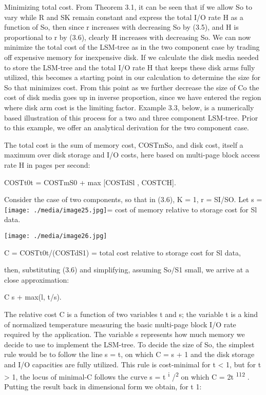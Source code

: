 \documentclass[a4paper,11pt,notitlepage,twoside,openright]{article}
\begin{document}
Minimizing total cost. From Theorem 3.1, it can be seen that if we allow
So to vary while R and SK remain constant and express the total I/O rate
H as a function of So, then since r increases with decreasing So by
(3.5), and H is proportional to r by (3.6), clearly H increases with
decreasing So. We can now minimize the total cost of the LSM-tree as in
the two component case by trading off expensive memory for inexpensive
disk. If we calculate the disk media needed to store the LSM-tree and
the total I/O rate H that keeps these disk arms fully utilized, this
becomes a starting point in our calculation to determine the size for So
that minimizes cost. From this point as we further decrease the size of
Co the cost of disk media goes up in inverse proportion, since we have
entered the region where disk arm cost is the limiting factor. Example
3.3, below, is a numerically based illustration of this process for a
two and three component LSM-tree. Prior to this example, we offer an
analytical derivation for the two component case.

The total cost is the sum of memory cost, COSTmSo, and disk cost, itself
a maximum over disk storage and I/O costs, here based on multi-page
block access rate H in pages per second:

COSTt0t = COSTmS0 + max {[}COSTdSl , COSTCH{]}.

Consider the case of two components, so that in (3.6), K = 1, r = SI/SO.
Let s =
\texttt{[image: ./media/image25.jpg]}=
cost of memory relative to storage cost for Sl data.

\texttt{[image: ./media/image26.jpg]}

C = COSTt0t/(COSTdS1) = total cost relative to storage cost for Sl data,

then, substituting (3.6) and simplifying, assuming So/S1 small, we
arrive at a close approximation:

C s + max(l, t/s).

The relative cost C is a function of two variables t and s; the variable
t is a kind of normalized temperature measuring the basic multi-page
block I/O rate required by the application. The variable s represents
how much memory we decide to use to implement the LSM-tree. To decide
the size of So, the simplest rule would be to follow the line s = t, on
which C = s + 1 and the disk storage and I/O capacities are fully
utilized. This rule is cost-minimal for t \textless{} 1, but for t
\textgreater{} 1, the locus of minimal-C follows the curve s = t
\textsuperscript{i} /\textsuperscript{2} on which C = 2t
\textsuperscript{112} . Putting the result back in dimensional form we
obtain, for t 1:
\end{document}
